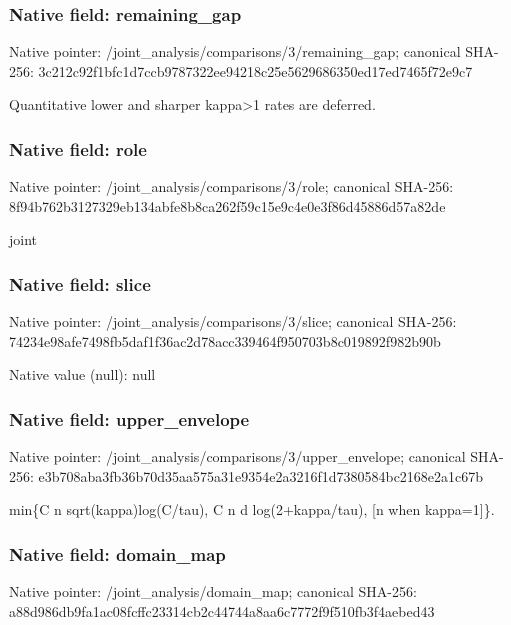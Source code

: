 \documentclass[10pt,a4paper]{article}
\begin{document}
\subsubsection{Native field: remaining\_\allowbreak{}gap}
Native pointer: /joint\_\allowbreak{}analysis/comparisons/3/remaining\_\allowbreak{}gap; canonical SHA-256: 3c212c92f1bfc1d7ccb9787322ee94218c25e5629686350ed17ed7465f72e9c7

\begingroup\raggedright\sloppy Quantitative lower and sharper kappa>1 rates are deferred.\par\endgroup

\subsubsection{Native field: role}
Native pointer: /joint\_\allowbreak{}analysis/comparisons/3/role; canonical SHA-256: 8f94b762b3127329eb134abfe8b8ca262f59c15e9c4e0e3f86d45886d57a82de

\begingroup\raggedright\sloppy joint\par\endgroup

\subsubsection{Native field: slice}
Native pointer: /joint\_\allowbreak{}analysis/comparisons/3/slice; canonical SHA-256: 74234e98afe7498fb5daf1f36ac2d78acc339464f950703b8c019892f982b90b

Native value (null): null

\subsubsection{Native field: upper\_\allowbreak{}envelope}
Native pointer: /joint\_\allowbreak{}analysis/comparisons/3/upper\_\allowbreak{}envelope; canonical SHA-256: e3b708aba3fb36b70d35aa575a31e9354e2a3216f1d7380584bc2168e2a1c67b

\begingroup\raggedright\sloppy min\{C n sqrt(kappa)log(C/\allowbreak{}tau),\allowbreak{} C n d log(2+kappa/\allowbreak{}tau),\allowbreak{} [n when kappa=\allowbreak{}1]\}.\par\endgroup

\subsubsection{Native field: domain\_\allowbreak{}map}
Native pointer: /joint\_\allowbreak{}analysis/domain\_\allowbreak{}map; canonical SHA-256: a88d986db9fa1ac08fcffc23314cb2c44744a8aa6c7772f9f510fb3f4aebed43
\end{document}
